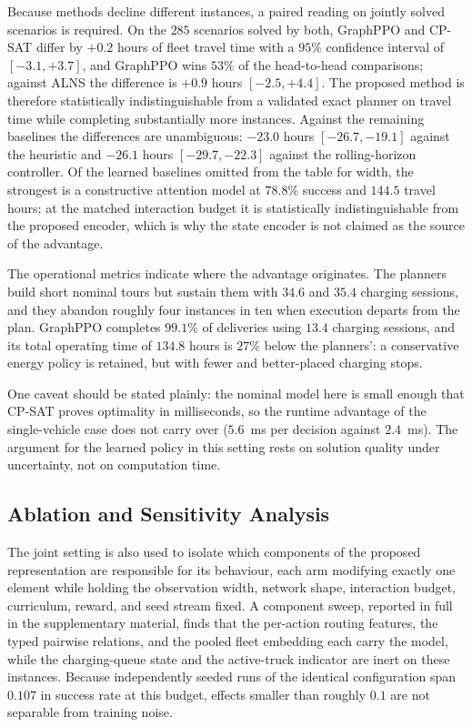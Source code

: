 \documentclass[journal]{IEEEtran}
\begin{document}
Because methods decline different instances, a paired reading on jointly solved scenarios is required. On the $285$ scenarios solved by both, GraphPPO and CP-SAT differ by $+0.2$ hours of fleet travel time with a $95\%$ confidence interval of $[-3.1, +3.7]$, and GraphPPO wins $53\%$ of the head-to-head comparisons; against ALNS the difference is $+0.9$ hours $[-2.5, +4.4]$. The proposed method is therefore statistically indistinguishable from a validated exact planner on travel time while completing substantially more instances. Against the remaining baselines the differences are unambiguous: $-23.0$ hours $[-26.7, -19.1]$ against the heuristic and $-26.1$ hours $[-29.7, -22.3]$ against the rolling-horizon controller. Of the learned baselines omitted from the table for width, the strongest is a constructive attention model at $78.8\%$ success and $144.5$ travel hours; at the matched interaction budget it is statistically indistinguishable from the proposed encoder, which is why the state encoder is not claimed as the source of the advantage.

The operational metrics indicate where the advantage originates. The planners build short nominal tours but sustain them with $34.6$ and $35.4$ charging sessions, and they abandon roughly four instances in ten when execution departs from the plan. GraphPPO completes $99.1\%$ of deliveries using $13.4$ charging sessions, and its total operating time of $134.8$ hours is $27\%$ below the planners': a conservative energy policy is retained, but with fewer and better-placed charging stops.

One caveat should be stated plainly: the nominal model here is small enough that CP-SAT proves optimality in milliseconds, so the runtime advantage of the single-vehicle case does not carry over ($5.6$~ms per decision against $2.4$~ms). The argument for the learned policy in this setting rests on solution quality under uncertainty, not on computation time.

\subsection{Ablation and Sensitivity Analysis}\label{sec:ablation}

The joint setting is also used to isolate which components of the proposed representation are responsible for its behaviour, each arm modifying exactly one element while holding the observation width, network shape, interaction budget, curriculum, reward, and seed stream fixed. A component sweep, reported in full in the supplementary material, finds that the per-action routing features, the typed pairwise relations, and the pooled fleet embedding each carry the model, while the charging-queue state and the active-truck indicator are inert on these instances. Because independently seeded runs of the identical configuration span $0.107$ in success rate at this budget, effects smaller than roughly $0.1$ are not separable from training noise.
\end{document}
